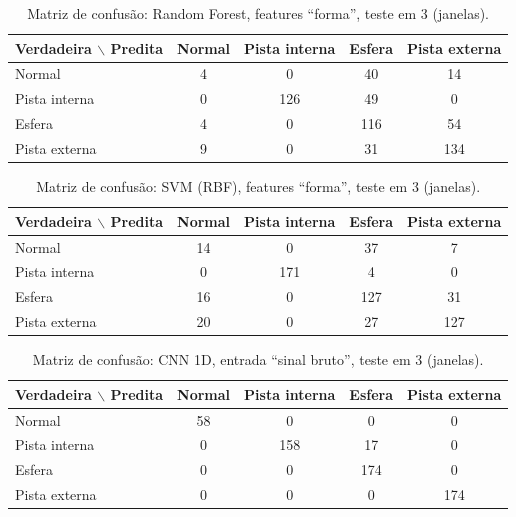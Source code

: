 \begin{table}[htb]
  \centering
  \caption{Matriz de confusão: Random Forest, features ``forma'', teste em \SI{3}{\hp} (janelas).}
  \label{tab:confusao-random-forest-forma}
  \begin{tabular}{lcccc}
    \toprule
    \textbf{Verdadeira $\backslash$ Predita} & \textbf{Normal} & \textbf{Pista interna} & \textbf{Esfera} & \textbf{Pista externa} \\
    \midrule
    Normal & 4 & 0 & 40 & 14 \\
    Pista interna & 0 & 126 & 49 & 0 \\
    Esfera & 4 & 0 & 116 & 54 \\
    Pista externa & 9 & 0 & 31 & 134 \\
    \bottomrule
  \end{tabular}
\end{table}

\begin{table}[htb]
  \centering
  \caption{Matriz de confusão: SVM (RBF), features ``forma'', teste em \SI{3}{\hp} (janelas).}
  \label{tab:confusao-svm-forma}
  \begin{tabular}{lcccc}
    \toprule
    \textbf{Verdadeira $\backslash$ Predita} & \textbf{Normal} & \textbf{Pista interna} & \textbf{Esfera} & \textbf{Pista externa} \\
    \midrule
    Normal & 14 & 0 & 37 & 7 \\
    Pista interna & 0 & 171 & 4 & 0 \\
    Esfera & 16 & 0 & 127 & 31 \\
    Pista externa & 20 & 0 & 27 & 127 \\
    \bottomrule
  \end{tabular}
\end{table}

\begin{table}[htb]
  \centering
  \caption{Matriz de confusão: CNN 1D, entrada ``sinal bruto'', teste em \SI{3}{\hp} (janelas).}
  \label{tab:confusao-cnn-1d-sinal-bruto}
  \begin{tabular}{lcccc}
    \toprule
    \textbf{Verdadeira $\backslash$ Predita} & \textbf{Normal} & \textbf{Pista interna} & \textbf{Esfera} & \textbf{Pista externa} \\
    \midrule
    Normal & 58 & 0 & 0 & 0 \\
    Pista interna & 0 & 158 & 17 & 0 \\
    Esfera & 0 & 0 & 174 & 0 \\
    Pista externa & 0 & 0 & 0 & 174 \\
    \bottomrule
  \end{tabular}
\end{table}

